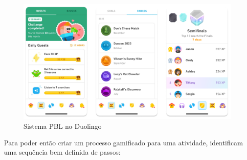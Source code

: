 \documentclass[
	12pt,
	openright,
	twoside,
	a4paper,
	english,
	brazil
	]{abntex2}
\begin{document}
\begin{figure}[H]
	\caption{\label{duolingo}Sistema PBL no Duolingo}
  \includegraphics[width=\textwidth]{duolingo}
\end{figure}

Para poder então criar um processo gamificado para uma atividade,  identificam uma sequência bem definida de passos:

\renewcommand{\arraystretch}{1.3}
\end{document}
